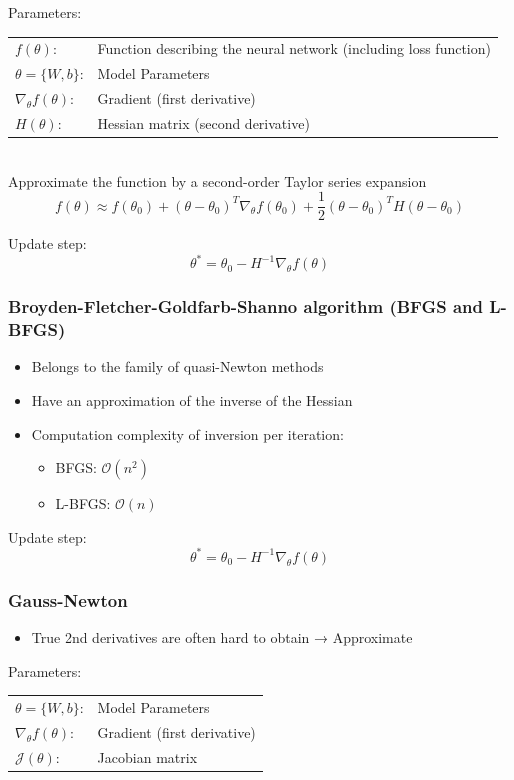 \documentclass[10pt,a4paper]{article}
\begin{document}
Parameters: \\
\begin{tabular}{ll}
	$f(\theta)$: & Function describing the neural network (including loss function) \\
	$\theta = \{W, b\}$: & Model Parameters \\
	$\nabla_\theta f(\theta)$: & Gradient (first derivative) \\
	$H(\theta)$: & Hessian matrix (second derivative)
\end{tabular} \\

Approximate the function by a second-order Taylor series expansion
$$
	f(\theta) \approx f(\theta_0) + (\theta - \theta_0)^T \nabla_\theta f(\theta_0) + \frac 1 2 (\theta - \theta_0)^T H(\theta - \theta_0)
$$

Update step:
$$
	\theta^* = \theta_0 - H^{-1} \nabla_\theta f(\theta)
$$

\subsubsection{Broyden-Fletcher-Goldfarb-Shanno algorithm (BFGS and L-BFGS)}
\begin{itemize}
	\item Belongs to the family of quasi-Newton methods
	\item Have an approximation of the inverse of the Hessian
	\item Computation complexity of inversion per iteration:
	\begin{itemize}
		\item BFGS: $\mathcal O(n^2)$
		\item L-BFGS: $\mathcal O(n)$
	\end{itemize}
\end{itemize}

Update step:
$$
	\theta^* = \theta_0 - H^{-1} \nabla_\theta f(\theta)
$$

\subsubsection{Gauss-Newton}
\begin{itemize}
	\item True 2nd derivatives are often hard to obtain → Approximate
\end{itemize}

Parameters: \\
\begin{tabular}{ll}
	$\theta = \{W, b\}$: & Model Parameters \\
	$\nabla_\theta f(\theta)$: & Gradient (first derivative) \\
	$\mathcal J(\theta)$: & Jacobian matrix
\end{tabular} \\
\end{document}
